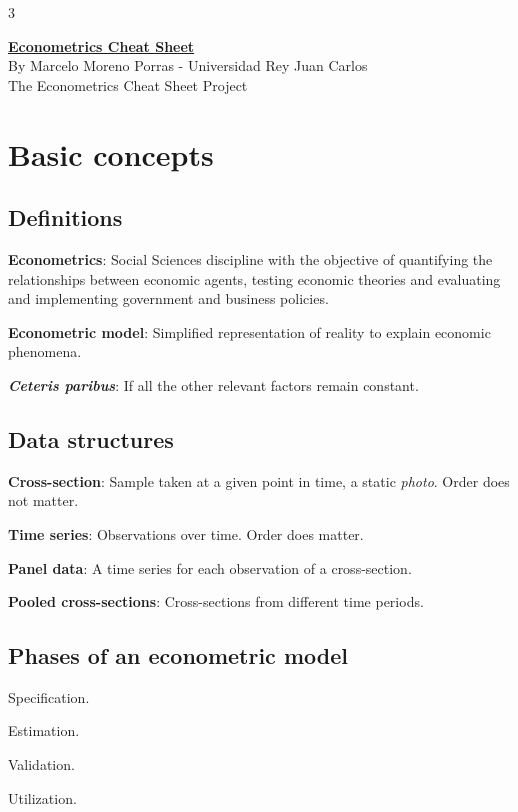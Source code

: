 \documentclass[10pt, a4paper, landscape]{article}
\begin{document}
\begin{multicols}{3}

\begin{center}
	\textbf{\LARGE \href{https://github.com/marcelomijas/econometrics-cheatsheet}{Econometrics Cheat Sheet}} \\
	{\footnotesize By Marcelo Moreno Porras - Universidad Rey Juan Carlos} \\
	{\footnotesize The Econometrics Cheat Sheet Project}
\end{center}

\section*{Basic concepts}

\subsection*{Definitions}

\textbf{Econometrics}: Social Sciences discipline with the objective of quantifying the relationships between economic agents, testing economic theories and evaluating and implementing government and business policies.

\textbf{Econometric model}: Simplified representation of reality to explain economic phenomena.

\textbf{\textsl{Ceteris paribus}}: If all the other relevant factors remain constant.

\subsection*{Data structures}

\textbf{Cross-section}: Sample taken at a given point in time, a static \textsl{photo}. Order does not matter.

\textbf{Time series}: Observations over time. Order does matter.

\textbf{Panel data}: A time series for each observation of a cross-section.

\textbf{Pooled cross-sections}: Cross-sections from different time periods.

\subsection*{Phases of an econometric model}

\begin{enumerate}[leftmargin=*]
	\begin{minipage}{0.45\columnwidth}
		\item Specification.
		\item Estimation.
	\end{minipage}
	\hfill
	\begin{minipage}{0.45\columnwidth}
		\item Validation.
		\item Utilization.
	\end{minipage}
\end{enumerate}


\end{multicols}
\end{document}
